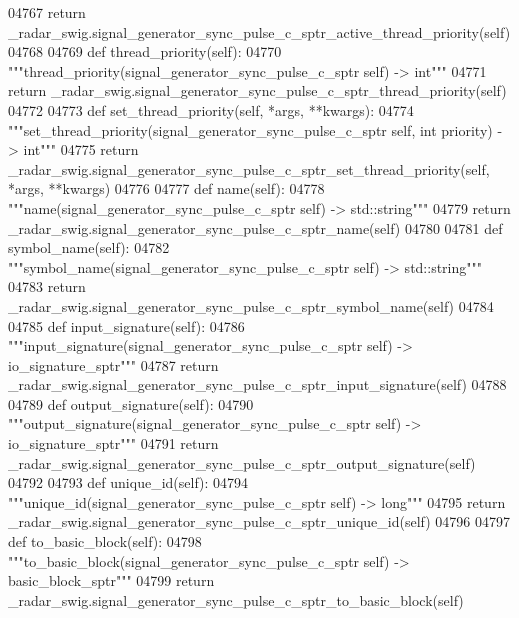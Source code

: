 \begin{DoxyCode}
{{{{{{{{{{{{{{{{04767         \textcolor{keywordflow}{return} \_radar\_swig.signal\_generator\_sync\_pulse\_c\_sptr\_active\_thread\_priority(self)
04768 
04769     \textcolor{keyword}{def }thread_priority(self):
04770         \textcolor{stringliteral}{"""thread\_priority(signal\_generator\_sync\_pulse\_c\_sptr self) -> int"""}
04771         \textcolor{keywordflow}{return} \_radar\_swig.signal\_generator\_sync\_pulse\_c\_sptr\_thread\_priority(self)
04772 
04773     \textcolor{keyword}{def }set_thread_priority(self, *args, **kwargs):
04774         \textcolor{stringliteral}{"""set\_thread\_priority(signal\_generator\_sync\_pulse\_c\_sptr self, int priority) -> int"""}
04775         \textcolor{keywordflow}{return} \_radar\_swig.signal\_generator\_sync\_pulse\_c\_sptr\_set\_thread\_priority(self, *args, **kwargs)
04776 
04777     \textcolor{keyword}{def }name(self):
04778         \textcolor{stringliteral}{"""name(signal\_generator\_sync\_pulse\_c\_sptr self) -> std::string"""}
04779         \textcolor{keywordflow}{return} \_radar\_swig.signal\_generator\_sync\_pulse\_c\_sptr\_name(self)
04780 
04781     \textcolor{keyword}{def }symbol_name(self):
04782         \textcolor{stringliteral}{"""symbol\_name(signal\_generator\_sync\_pulse\_c\_sptr self) -> std::string"""}
04783         \textcolor{keywordflow}{return} \_radar\_swig.signal\_generator\_sync\_pulse\_c\_sptr\_symbol\_name(self)
04784 
04785     \textcolor{keyword}{def }input_signature(self):
04786         \textcolor{stringliteral}{"""input\_signature(signal\_generator\_sync\_pulse\_c\_sptr self) -> io\_signature\_sptr"""}
04787         \textcolor{keywordflow}{return} \_radar\_swig.signal\_generator\_sync\_pulse\_c\_sptr\_input\_signature(self)
04788 
04789     \textcolor{keyword}{def }output_signature(self):
04790         \textcolor{stringliteral}{"""output\_signature(signal\_generator\_sync\_pulse\_c\_sptr self) -> io\_signature\_sptr"""}
04791         \textcolor{keywordflow}{return} \_radar\_swig.signal\_generator\_sync\_pulse\_c\_sptr\_output\_signature(self)
04792 
04793     \textcolor{keyword}{def }unique_id(self):
04794         \textcolor{stringliteral}{"""unique\_id(signal\_generator\_sync\_pulse\_c\_sptr self) -> long"""}
04795         \textcolor{keywordflow}{return} \_radar\_swig.signal\_generator\_sync\_pulse\_c\_sptr\_unique\_id(self)
04796 
04797     \textcolor{keyword}{def }to_basic_block(self):
04798         \textcolor{stringliteral}{"""to\_basic\_block(signal\_generator\_sync\_pulse\_c\_sptr self) -> basic\_block\_sptr"""}
04799         \textcolor{keywordflow}{return} \_radar\_swig.signal\_generator\_sync\_pulse\_c\_sptr\_to\_basic\_block(self)
}}}}}}}}}}}}}}}}
\end{DoxyCode}
